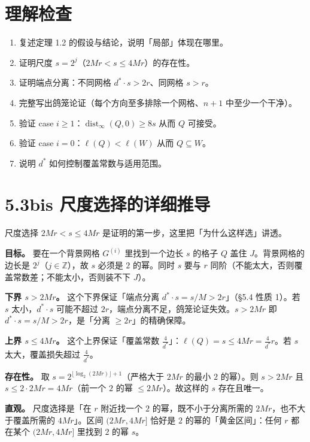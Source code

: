 \documentclass[a4paper,11pt,openany]{ctexbook}
\numberwithin{equation}{chapter}
\numberwithin{figure}{chapter}
\numberwithin{table}{chapter}
\begin{document}
\section{理解检查}

\begin{enumerate}
\item 复述定理 1.2 的假设与结论，说明「局部」体现在哪里。
\item 证明尺度 $s=2^j$（$2Mr<s\le4Mr$）的存在性。
\item 证明端点分离：不同网格 $d^*\cdot s>2r$、同网格 $s>r$。
\item 完整写出鸽笼论证（每个方向至多排除一个网格、$n+1$ 中至少一个干净）。
\item 验证 case $i\ge1$：$\operatorname{dist}_\infty(Q,0)\ge8s$ 从而 $Q$ 可接受。
\item 验证 case $i=0$：$\ell(Q)<\ell(W)$ 从而 $Q\subseteq W$。
\item 说明 $d^*$ 如何控制覆盖常数与适用范围。
\end{enumerate}

\section{5.3bis 尺度选择的详细推导}

尺度选择 $2Mr<s\le4Mr$ 是证明的第一步，这里把「为什么这样选」讲透。

\textbf{目标。} 要在一个背景网格 $G^{(i)}$ 里找到一个边长 $s$ 的格子 $Q$ 盖住 $J$。背景网格的边长是 $2^j$（$j\in\mathbb Z$），故 $s$ 必须是 $2$ 的幂。同时 $s$ 要与 $r$ 同阶（不能太大，否则覆盖常数差；不能太小，否则装不下 $J$）。

\textbf{下界 $s>2Mr$。} 这个下界保证「端点分离 $d^*\cdot s=s/M>2r$」（§5.4 性质 1）。若 $s$ 太小，$d^*\cdot s$ 可能不超过 $2r$，端点分离不足，鸽笼论证失效。$s>2Mr$ 即 $d^*\cdot s=s/M>2r$，是「分离 $\ge2r$」的精确保障。

\textbf{上界 $s\le4Mr$。} 这个上界保证「覆盖常数 $\frac4{d^*}$」：$\ell(Q)=s\le4Mr=\frac4{d^*}r$。若 $s$ 太大，覆盖损失超过 $\frac4{d^*}$。

\textbf{存在性。} 取 $s=2^{\lfloor\log_2(2Mr)\rfloor+1}$（严格大于 $2Mr$ 的最小 $2$ 的幂）。则 $s>2Mr$ 且 $s\le2\cdot2Mr=4Mr$（前一个 $2$ 的幂 $\le2Mr$）。故这样的 $s$ 存在且唯一。

\textbf{直观。} 尺度选择是「在 $r$ 附近找一个 $2$ 的幂，既不小于分离所需的 $2Mr$，也不大于覆盖所需的 $4Mr$」。区间 $(2Mr,4Mr]$ 恰好是 $2$ 的幂的「黄金区间」：任何 $r$ 都在某个 $(2Mr,4Mr]$ 里找到 $2$ 的幂 $s$。
\end{document}
